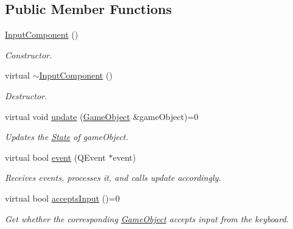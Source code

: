 \subsection*{Public Member Functions}
\begin{DoxyCompactItemize}
\item 
\hypertarget{classInputComponent_ae3af150f66c8e72ea4bef4b089c48d99}{\hyperlink{classInputComponent_ae3af150f66c8e72ea4bef4b089c48d99}{Input\-Component} ()}\label{classInputComponent_ae3af150f66c8e72ea4bef4b089c48d99}

\begin{DoxyCompactList}\small\item\em Constructor. \end{DoxyCompactList}\item 
\hypertarget{classInputComponent_a2004af6e68e0206f045518cb6ee43981}{virtual \hyperlink{classInputComponent_a2004af6e68e0206f045518cb6ee43981}{$\sim$\-Input\-Component} ()}\label{classInputComponent_a2004af6e68e0206f045518cb6ee43981}

\begin{DoxyCompactList}\small\item\em Destructor. \end{DoxyCompactList}\item 
virtual void \hyperlink{classInputComponent_a93e790f7279e842ee249fefe7dbf7b32}{update} (\hyperlink{classGameObject}{Game\-Object} \&game\-Object)=0
\begin{DoxyCompactList}\small\item\em Updates the \hyperlink{classState}{State} of game\-Object. \end{DoxyCompactList}\item 
virtual bool \hyperlink{classInputComponent_a6e9e903cdb89d7eb7d9ab89d1734f7aa}{event} (Q\-Event $\ast$event)
\begin{DoxyCompactList}\small\item\em Receives events, processes it, and calls update accordingly. \end{DoxyCompactList}\item 
virtual bool \hyperlink{classInputComponent_a27a4de99780ddf7d7a4f9d469f13640c}{accepts\-Input} ()=0
\begin{DoxyCompactList}\small\item\em Get whether the corresponding \hyperlink{classGameObject}{Game\-Object} accepts input from the keyboard. \end{DoxyCompactList}\end{DoxyCompactItemize}
